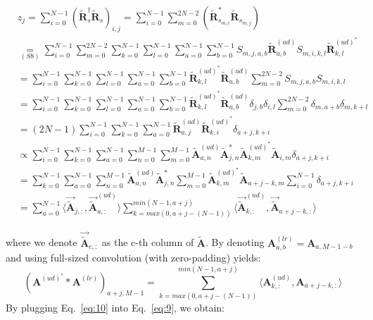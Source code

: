 \documentclass[pdflatex,sn-mathphys-num,Numbered]{sn-jnl}%
\theoremstyle{thmstyleone}%
\theoremstyle{thmstyletwo}%
\theoremstyle{thmstylethree}%
\begin{document}
\begin{align}
& z_j = \sum^{N-1}_{i=0}(\tilde{\textbf{R}}^{\dagger}_{s}\tilde{\textbf{R}}_{s})_{i,j} = \sum^{N-1}_{i=0} \sum^{2N-2}_{m=0}(\tilde{\textbf{R}}^{*}_{s_{m,i}}\tilde{\textbf{R}}_{s_{m,j}}) \nonumber &\\&\underset{(S8)}{=}  \sum^{N-1}_{i=0}\sum^{2N-2}_{m=0}\sum^{N-1}_{k=0}\sum^{N-1}_{l=0}\sum^{N-1}_{a=0}\sum^{N-1}_{b=0}S_{m,j,a,b}\tilde{\textbf{R}}^{(ud)}_{a,b}S_{m,i,k,l}\tilde{\textbf{R}}^{(ud)^*}_{k,l} \nonumber &\\ 
&= \sum^{N-1}_{i=0}\sum^{N-1}_{k=0}\sum^{N-1}_{l=0}\sum^{N-1}_{a=0}\sum^{N-1}_{b=0}\tilde{\textbf{R}}^{(ud)^*}_{k,l}\tilde{\textbf{R}}^{(ud)}_{a,b}\sum^{2N-2}_{m=0}S_{m,j,a,b}S_{m,i,k,l} \nonumber &\\ 
&= \sum^{N-1}_{i=0}\sum^{N-1}_{k=0}\sum^{N-1}_{l=0}\sum^{N-1}_{a=0}\sum^{N-1}_{b=0}\tilde{\textbf{R}}^{(ud)^*}_{k,l}\tilde{\textbf{R}}^{(ud)}_{a,b}\delta_{j,b}\delta_{i,l}\sum^{2N-2}_{m=0}\delta_{m,a+b}\delta_{m,k+l} \nonumber &\\ 
&= (2N-1)\sum^{N-1}_{i=0}\sum^{N-1}_{k=0}\sum^{N-1}_{a=0}\tilde{\textbf{R}}^{(ud)}_{a,j}\tilde{\textbf{R}}^{(ud)^*}_{k,i}\delta_{a+j,k+i} \nonumber &\\ 
&\propto \sum^{N-1}_{i=0}\sum^{N-1}_{k=0}\sum^{N-1}_{a=0}\sum^{M-1}_{n=0}\sum^{M-1}_{m=0}\tilde{\textbf{A}}^{(ud)}_{a,n}\tilde{\textbf{A}}^*_{j,n}\tilde{\textbf{A}}^{(ud)^*}_{k,m}\tilde{\textbf{A}}_{i,m}\delta_{a+j,k+i} \nonumber &\\ 
&= \sum^{N-1}_{k=0}\sum^{N-1}_{a=0}\sum^{M-1}_{n=0}\tilde{\textbf{A}}^{(ud)}_{a,n}\tilde{\textbf{A}}^*_{j,n}\sum^{M-1}_{m=0}\tilde{\textbf{A}}^{(ud)^*}_{k,m}\tilde{\textbf{A}}_{a+j-k,m}\sum^{N-1}_{i=0}\delta_{a+j,k+i}
 \nonumber &\\ 
&= \sum^{N-1}_{a=0}\langle \vec{\tilde{\textbf{A}}}_{j,:},\vec{\tilde{\textbf{A}}}^{(ud)}_{a,:} \rangle\sum^{min(N-1,a+j)}_{k=max(0,a+j-(N-1))}\langle \vec{\tilde{\textbf{A}}}^{(ud)}_{k,:},\vec{\tilde{\textbf{A}}}_{a+j-k,:} \rangle &
\tag{S9}
\label{eq:9}
\end{align}

where we denote $\vec{\tilde{\textbf{A}}}_{c,:}$ as the c-th column of $\tilde{\textbf{A}}$. By denoting ${\textbf{A}}^{(lr)}_{a,b}={\textbf{A}}_{a,M-1-b}$ and using full-sized convolution (with zero-padding) yields:
\begin{equation}
({\textbf{A}}^{(ud)^*}*{\textbf{A}}^{(lr)})_{a+j,M-1} = \sum^{min(N-1,a+j)}_{k=max(0,a+j-(N-1))}\langle {\textbf{A}}^{(ud)}_{k,:},{\textbf{A}}_{a+j-k,:} \rangle \label{eq:10} \tag{S10}
\end{equation}
By plugging Eq.~\ref{eq:10} into Eq.~\ref{eq:9}, we obtain:
\end{document}
